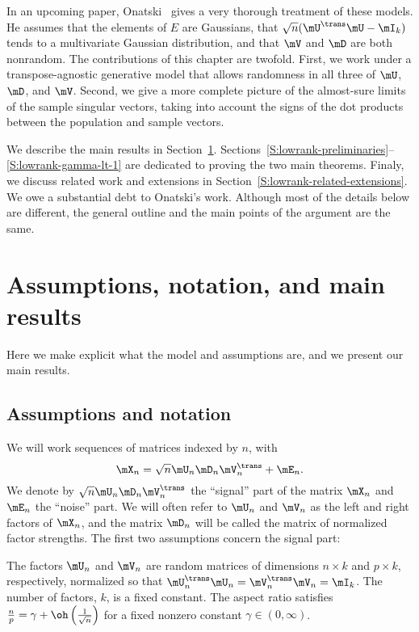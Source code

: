 In an upcoming paper, Onatski~\cite{onatski2009} gives a very thorough
treatment of these models. He assumes that the elements of $E$ are \iid
Gaussians, that $\sqrt{n} ( \mU^\trans \mU - \mI_k) $ tends to a multivariate
Gaussian distribution, and that $\mV$ and $\mD$ are both nonrandom. The
contributions of this chapter are twofold. First, we work under a
transpose-agnostic generative model that allows randomness in all three of
$\mU$, $\mD$, and $\mV$. Second, we give a more complete picture of the
almost-sure limits of the sample singular vectors, taking into account the
signs of the dot products between the population and sample vectors.

We describe the main results in Section~\ref{S:lowrank-assumptions-results}.
Sections~\ref{S:lowrank-preliminaries}--\ref{S:lowrank-gamma-lt-1} are dedicated to proving the two main theorems.  Finaly, we discuss related work and extensions in Section~\ref{S:lowrank-related-extensions}.  We owe a substantial debt to Onatski's work.  Although most of the details below are different, the general outline and the main points of the argument are the same.

\section{Assumptions, notation, and main results}\label{S:lowrank-assumptions-results}

Here we make explicit what the model and assumptions are, and we present our
main results.

\subsection{Assumptions and notation}

We will work sequences of matrices indexed by $n$, with
\[
    \mX_n = \sqrt{n} \mU_n \mD_n \mV_n^\trans + \mE_n.
\]
We denote by $\sqrt{n} \mU_n \mD_n \mV_n^\trans$ the ``signal'' part of the
matrix $\mX_n$ and $\mE_n$ the ``noise'' part. We will often refer to $\mU_n$
and $\mV_n$ as the left and right factors of $\mX_n$, and the matrix $\mD_n$
will be called the matrix of normalized factor strengths. The first two
assumptions concern the signal part:

\begin{assumption}\label{A:factors}
    The factors $\mU_n$ and $\mV_n$ are random matrices of dimensions
    $n \times k$ and $p \times k$, respectively, normalized so that
    $\mU_n^\trans \mU_n =  \mV_n^\trans \mV_n = \mI_k$. 
    The number of factors, $k$, is a fixed constant.  The aspect ratio
    satisfies $\frac{n}{p} = \gamma + \oh\left( \frac{1}{\sqrt{n}} \right)$
    for a fixed nonzero constant $\gamma \in (0,\infty)$.
\end{assumption}
\noindent

